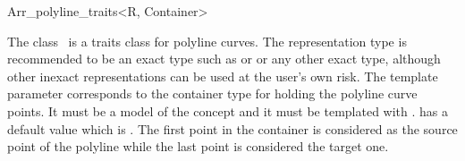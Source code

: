
\ccRefPageBegin

\begin{ccRefClass}{Arr_polyline_traits<R, Container>}

\ccDefinition
    The class \ccRefName\ is a traits class for polyline curves.  The
    representation type  is recommended to be an exact type
    such as  or 
    or any other exact type, although other inexact representations
    can be used at the user's own risk.  The template parameter
     corresponds to the container type for holding the
    polyline curve points. It must be a model of the  concept and it must be templated with
    .  has a default value which is
    . The first point in the container
    is considered as the source point of the polyline while the last
    point is considered the target one.


\ccIsModel
     

\end{ccRefClass}



\ccRefPageEnd
